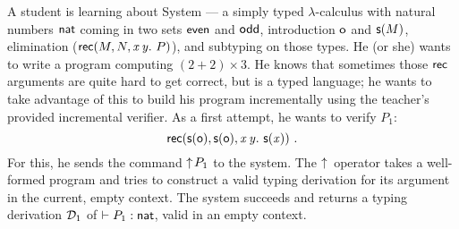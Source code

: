 \documentclass{llncs}
\begin{document}











A student is learning about System  --- a simply
typed $\lambda$-calculus with natural numbers $\text{\textsf{nat}}$ coming in
two sets $\text{\textsf{even}}$ and $\text{\textsf{odd}}$, introduction $\text{\textsf{o}}$ and $\text{\textsf{s}} ({M})$,
elimination ($\text{\textsf{rec}}({M},{N},{\text{\textit{x}}}\,{\text{\textit{y}}}.\ {P})$), and subtyping on those types. He (or
she) wants to write a program computing $(2+2)\times 3$. He knows that
sometimes those $\text{\textsf{rec}}$ arguments are quite hard to get correct,
but  is a typed language; he wants to take advantage
of this to build his program incrementally using the teacher's
provided incremental verifier. As a first attempt, he wants to verify
$P_1$:
$$
\recb{\s\z}{\s\z} x y {\s {\var x}}\ \text{.}
$$
For this, he sends the command $\uparrow\!{P_1}$ to the system. The
$\uparrow\!{}$ operator takes a well-formed program and tries to construct
a valid typing derivation for its argument in the current, empty
context. The system succeeds and returns a typing derivation $\mathcal D_1$
of \/ $\vdash P_1 : \text{\textsf{nat}}$, valid in an empty context.
\end{document}
